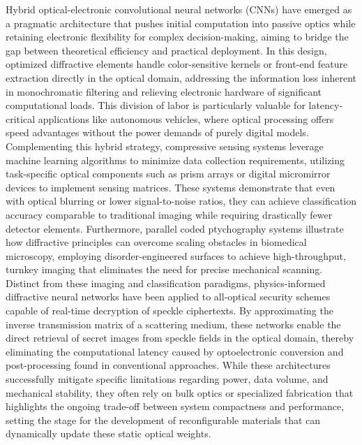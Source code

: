 \documentclass[11pt]{article}
\begin{document}
Hybrid optical-electronic convolutional neural networks (CNNs) have emerged as a pragmatic architecture that pushes initial computation into passive optics while retaining electronic flexibility for complex decision-making, aiming to bridge the gap between theoretical efficiency and practical deployment. In this design, optimized diffractive elements handle color-sensitive kernels or front-end feature extraction directly in the optical domain, addressing the information loss inherent in monochromatic filtering and relieving electronic hardware of significant computational loads. This division of labor is particularly valuable for latency-critical applications like autonomous vehicles, where optical processing offers speed advantages without the power demands of purely digital models. Complementing this hybrid strategy, compressive sensing systems leverage machine learning algorithms to minimize data collection requirements, utilizing task-specific optical components such as prism arrays or digital micromirror devices to implement sensing matrices. These systems demonstrate that even with optical blurring or lower signal-to-noise ratios, they can achieve classification accuracy comparable to traditional imaging while requiring drastically fewer detector elements. Furthermore, parallel coded ptychography systems illustrate how diffractive principles can overcome scaling obstacles in biomedical microscopy, employing disorder-engineered surfaces to achieve high-throughput, turnkey imaging that eliminates the need for precise mechanical scanning. Distinct from these imaging and classification paradigms, physics-informed diffractive neural networks have been applied to all-optical security schemes capable of real-time decryption of speckle ciphertexts. By approximating the inverse transmission matrix of a scattering medium, these networks enable the direct retrieval of secret images from speckle fields in the optical domain, thereby eliminating the computational latency caused by optoelectronic conversion and post-processing found in conventional approaches. While these architectures successfully mitigate specific limitations regarding power, data volume, and mechanical stability, they often rely on bulk optics or specialized fabrication that highlights the ongoing trade-off between system compactness and performance, setting the stage for the development of reconfigurable materials that can dynamically update these static optical weights. \citep{doi_10_1038_s41598_018_30619_y_5f5bfb09} \citep{doi_10_1117_1_oe_59_5_051404_363a991a} \citep{doi_10_1021_acsphotonics_1c01085_479fdea3} \citep{doi_10_1117_1_apn_5_1_016010_3e30c230}
\end{document}
